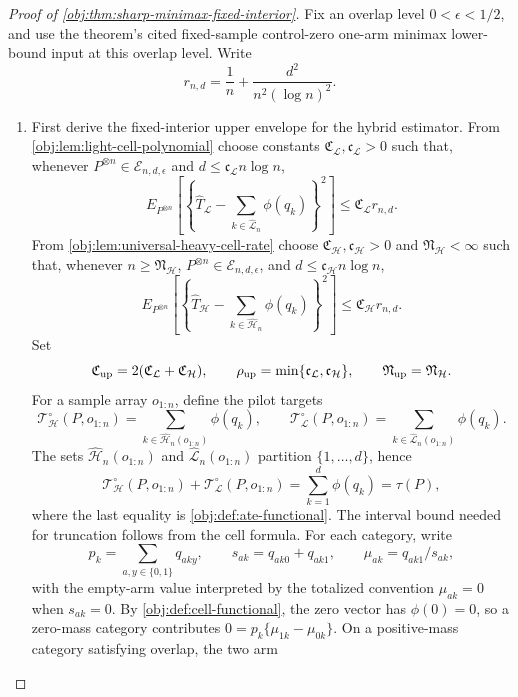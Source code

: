 \begin{proof}[Proof of \cref{obj:thm:sharp-minimax-fixed-interior}]
Fix an overlap level \(0<\epsilon<1/2\), and use the theorem's cited fixed-sample control-zero one-arm minimax lower-bound input at this overlap level.  Write
\[
r_{n,d}=\frac1n+\frac{d^2}{n^2(\log n)^2}.
\]
\begin{enumerate}
\item First derive the fixed-interior upper envelope for the hybrid estimator.  From
\cref{obj:lem:light-cell-polynomial} choose constants
\(\mathfrak C_{\mathcal L},\mathfrak c_{\mathcal L}>0\) such that, whenever
\(P^{\otimes n}\in\mathcal E_{n,d,\epsilon}\) and
\(d\le \mathfrak c_{\mathcal L}n\log n\),
\[
E_{P^{\otimes n}}\!\left[
\left\{
\widehat T_{\mathcal L}
-
\sum_{k\in\widehat{\mathcal L}_n}\phi(q_k)
\right\}^2
\right]
\le
\mathfrak C_{\mathcal L} r_{n,d}.
\]
From \cref{obj:lem:universal-heavy-cell-rate} choose
\(\mathfrak C_{\mathcal H},\mathfrak c_{\mathcal H}>0\) and
\(\mathfrak N_{\mathcal H}<\infty\) such that, whenever
\(n\ge\mathfrak N_{\mathcal H}\), \(P^{\otimes n}\in\mathcal E_{n,d,\epsilon}\), and
\(d\le \mathfrak c_{\mathcal H}n\log n\),
\[
E_{P^{\otimes n}}\!\left[
\left\{
\widehat T_{\mathcal H}
-
\sum_{k\in\widehat{\mathcal H}_n}\phi(q_k)
\right\}^2
\right]
\le
\mathfrak C_{\mathcal H} r_{n,d}.
\]
Set
\[
\mathfrak C_{\rm up}=2(\mathfrak C_{\mathcal L}+\mathfrak C_{\mathcal H}),
\qquad
\mathfrak\rho_{\rm up}=\min\{\mathfrak c_{\mathcal L},\mathfrak c_{\mathcal H}\},
\qquad
\mathfrak N_{\rm up}=\mathfrak N_{\mathcal H}.
\]
For a sample array \(o_{1:n}\), define the pilot targets
\[
\mathcal T_{\mathcal H}^{\circ}(P,o_{1:n})
=
\sum_{k\in\widehat{\mathcal H}_n(o_{1:n})}\phi(q_k),
\qquad
\mathcal T_{\mathcal L}^{\circ}(P,o_{1:n})
=
\sum_{k\in\widehat{\mathcal L}_n(o_{1:n})}\phi(q_k).
\]
The sets \(\widehat{\mathcal H}_n(o_{1:n})\) and \(\widehat{\mathcal L}_n(o_{1:n})\) partition \(\{1,\ldots,d\}\), hence
\[
\mathcal T_{\mathcal H}^{\circ}(P,o_{1:n})
+
\mathcal T_{\mathcal L}^{\circ}(P,o_{1:n})
=
\sum_{k=1}^d\phi(q_k)
=
\tau(P),
\]
where the last equality is \cref{obj:def:ate-functional}.
The interval bound needed for truncation follows from the cell formula.  For each category, write
\[
p_k=\sum_{a,y\in\{0,1\}}q_{aky},
\qquad
s_{ak}=q_{ak0}+q_{ak1},
\qquad
\mu_{ak}=q_{ak1}/s_{ak},
\]
with the empty-arm value interpreted by the totalized convention \(\mu_{ak}=0\) when
\(s_{ak}=0\).  By \cref{obj:def:cell-functional}, the zero vector has
\(\phi(0)=0\), so a zero-mass category contributes
\(0=p_k\{\mu_{1k}-\mu_{0k}\}\).  On a positive-mass category satisfying overlap, the two arm

\end{enumerate}
\end{proof}
